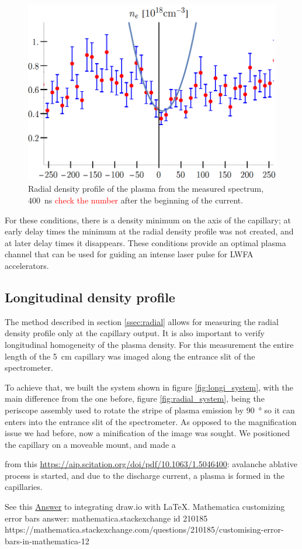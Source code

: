 \documentclass[justified,nofonts,nobib,openany]{tufte-book}
\begin{document}
\begin{figure}
\centering
\includegraphics[width=\textwidth]{figures/spectro/parabolic.png}
    \caption{Radial density profile of the plasma from the measured spectrum, \SI{400}{\ns} \textcolor{red}{check the number} after the beginning of the current.}
    
\label{fig:plasma_channel_spectro}
\end{figure}

For these conditions, there is a density minimum on the axis of the capillary; at early delay times the minimum at the radial density profile was not created, and at later delay times it disappears. These conditions provide an optimal plasma channel that can be used for guiding an intense laser pulse for LWFA accelerators.

\subsection{Longitudinal density profile}\label{ssec:longi}

The method described in section \ref{ssec:radial} allows for measuring the radial density profile only at the capillary output. It is also important to verify longitudinal homogeneity of the plasma density. For this measurement the entire length of the \SI{5}{\cm} capillary was imaged along the entrance slit of the spectrometer.

To achieve that, we built the system shown in figure \ref{fig:longi_system}, with the main difference from the one before, figure \ref{fig:radial_system}, being the periscope assembly used to rotate the stripe of plasma emission by \SI{90}{\degree} so it can enters into the entrance slit of the spectrometer. As opposed to the magnification issue we had before, now a minification of the image was sought. We positioned the capillary on a moveable mount, and made a 


from this \href{article}{https://aip.scitation.org/doi/pdf/10.1063/1.5046400}: avalanche ablative process is started, and due to the discharge current, a plasma is formed in the capillaries.

See this \href{https://tex.stackexchange.com/a/427625}{Answer} to integrating draw.io with LaTeX.
Mathematica customizing error bars answer:
mathematica.stackexchange id 210185
https://mathematica.stackexchange.com/questions/210185/customising-error-bars-in-mathematica-12
\printbibliography
\end{document}
